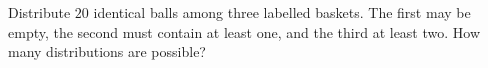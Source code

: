 Distribute $20$ identical balls among three labelled baskets. The first may be empty, the second must contain at least one, and the third at least two. How many distributions are possible?
